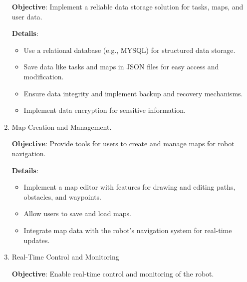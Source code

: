 \begin{enumerate}
        \vspace{-1.5mm}
        \textbf{Objective}: Implement a reliable data storage solution for tasks, maps, and user data.

        \vspace{-1.5mm}
        \textbf{Details}:
        \begin{itemize}
            \vspace{-1mm}
            \item Use a relational database (e.g., MYSQL) for structured data storage.
            \vspace{-1mm}
            \item Save data like tasks and maps in JSON files for easy access and modification.
            \vspace{-1mm}
            \item Ensure data integrity and implement backup and recovery mechanisms.
            \vspace{-1mm}
            \item Implement data encryption for sensitive information.
        \end{itemize}

    
    \item Map Creation and Management.
    
        \vspace{-1.5mm}
        \textbf{Objective}: Provide tools for users to create and manage maps for robot navigation.

        \vspace{-1.5mm}
        \textbf{Details}:
        \begin{itemize}
            \vspace{-1mm}
            \item Implement a map editor with features for drawing and editing paths, obstacles, and waypoints.
            \vspace{-1mm}
            \item Allow users to save and load maps.
            \vspace{-1mm}
            \item Integrate map data with the robot's navigation system for real-time updates.
        \end{itemize}

    \item Real-Time Control and Monitoring
        
        \vspace{-1.5mm}
        \textbf{Objective}: Enable real-time control and monitoring of the robot.


\end{enumerate}
